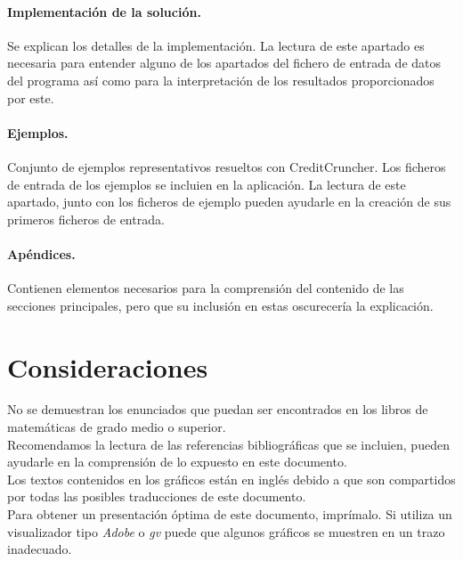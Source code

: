 \paragraph{Implementaci\'on de la soluci\'on.} Se explican los detalles de
la implementaci\'on. La lectura de este apartado es necesaria para entender 
alguno de los apartados del fichero de entrada de datos del programa as\'i como 
para la interpretaci\'on de los resultados proporcionados por este.

\paragraph{Ejemplos.} Conjunto de ejemplos representativos resueltos con
CreditCruncher. Los ficheros de entrada de los ejemplos se incluien en la
aplicaci\'on. La lectura de este apartado, junto con los ficheros de ejemplo 
pueden ayudarle en la creaci\'on de sus primeros ficheros de entrada.

\paragraph{Ap\'endices.} Contienen elementos necesarios para la comprensi\'on 
del contenido de las secciones principales, pero que su inclusi\'on en estas 
oscurecer\'ia la explicaci\'on.

\section{Consideraciones}

No se demuestran los enunciados que puedan ser encontrados en los libros de 
matem\'aticas de grado medio o superior. \\

Recomendamos la lectura de las referencias bibliogr\'aficas que se incluien, 
pueden ayudarle en la comprensi\'on de lo expuesto en este documento.\\

Los textos contenidos en los gr\'aficos est\'an en ingl\'es debido a que son 
compartidos por todas las posibles traducciones de este documento.\\

Para obtener un presentaci\'on \'optima de este documento, impr\'imalo. Si 
utiliza un visualizador tipo \emph{Adobe} o \emph{gv} puede que algunos 
gr\'aficos se muestren en un trazo inadecuado.

